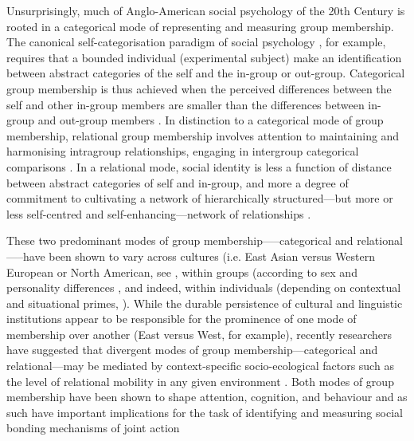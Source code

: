 Unsurprisingly, much of Anglo-American social psychology of the 20th Century is rooted in a categorical mode of representing and measuring group membership.  The canonical self-categorisation paradigm of social psychology \citep{Turner1987}, for example, requires that a bounded individual (experimental subject) make an identification between abstract categories of the self and the in-group or out-group.  Categorical group membership is thus achieved when the perceived differences between the self and other in-group members are smaller than the differences between in-group and out-group members \citep{Yuki2014}.  In distinction to a categorical mode of group membership, relational group membership involves attention to maintaining and harmonising intragroup relationships, engaging in intergroup categorical comparisons \citep{Yuki2003}.
In a relational mode, social identity is less a function of distance between abstract categories of self and in-group, and more a degree of commitment to cultivating a network of hierarchically structured---but more or less self-centred and self-enhancing---network of relationships \citep{Liu2009,Nisbett2003}.

These two predominant modes of group membership—--categorical and relational—--have been shown to vary across cultures (i.e. East Asian versus Western European or North American, see \citep{Markus1991,Nisbett2001,Yuki2003}, within groups (according to sex and personality differences \citep{Yuki2014}, and indeed, within individuals (depending on contextual and situational primes, \citep{Lee2014,Wong2005}).  While the durable persistence of cultural and linguistic institutions appear to be responsible for the prominence of one mode of membership over another (East versus West, for example), recently researchers have suggested that divergent modes of group membership—categorical and relational—may be mediated by context-specific socio-ecological factors such as the level of relational mobility in any given environment \citep{Oishi2010,Takagishi2014,Yuki2005}.  Both modes of group membership have been shown to shape attention, cognition, and behaviour \citep{Nisbett2003} and as such have important implications for the task of identifying and measuring social bonding mechanisms of joint action

